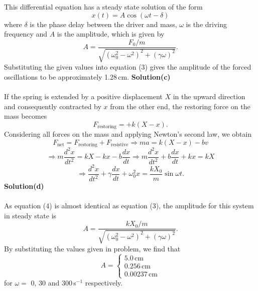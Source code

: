 \documentclass[12pt,a4paper]{article}
\begin{document}
This differential equation has a steady state solution of the form
\[x(t)=A\cos(\omega t-\delta)\]
where $\delta$ is the phase delay between the driver and mass, $\omega$ is the driving frequency and $A$ is the amplitude, which is given by
\begin{equation}
    A=\frac{F_0/m}{\sqrt{(\omega_0^2-\omega^2)^2+(\gamma\omega)^2}}.
\end{equation}
Substituting the given values into equation (3) gives the amplitude of the forced oscillations to be approximately 1.28\,cm.
\newpage
\textbf{Solution(c)}
\\
\\If the spring is extended by a positive displacement $X$ in the upward direction and consequently contracted by $x$ from the other end, the restoring force on the mass becomes
\[F_{\text{restoring}}=+k(X-x).\]
Considering all forces on the mass and applying Newton's second law, we obtain
\[F_{\text{net}}=F_{\text{restoring}}+F_{\text{resistive}}\Rightarrow ma=k(X-x)-bv\]
\[\Rightarrow m\frac{d^2x}{dt^2}=kX-kx-b\frac{dx}{dt}\Rightarrow m\frac{d^2x}{dt^2}+b\frac{dx}{dt}+kx=kX\]
\begin{equation}
    \Rightarrow\frac{d^2x}{dt^2}+\gamma\frac{dx}{dt}+\omega_0^2x=\frac{kX_0}{m}\sin\omega t.
\end{equation}
\textbf{Solution(d)}
\\
\\As equation (4) is almost identical as equation (3), the amplitude for this system in steady state is 
\begin{equation}
    A=\frac{kX_0/m}{\sqrt{(\omega_0^2-\omega^2)^2+(\gamma\omega)^2}}.
\end{equation}
By substituting the values given in problem, we find that
\[A=\begin{cases}
    5.0\,\text{cm}
    \\0.256\,\text{cm}
    \\0.00237\,\text{cm}
\end{cases}\]
for $\omega=$ 0, 30 and 300\,s$^{-1}$ respectively.
\end{document}
